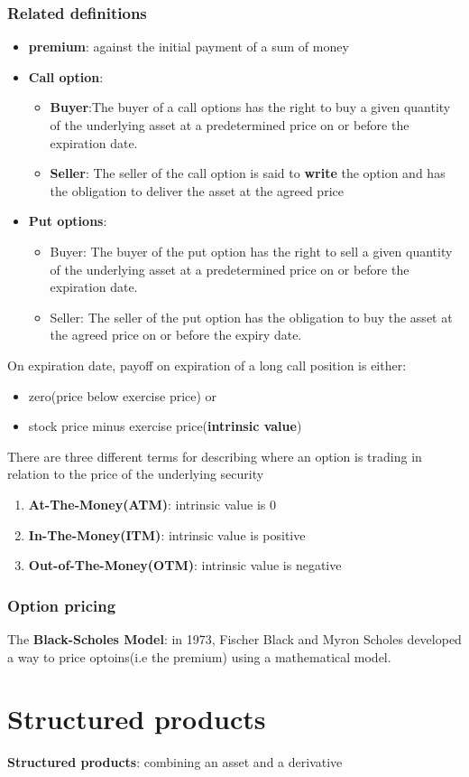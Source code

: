 \documentclass{article}
\theoremstyle{definition}
\theoremstyle{thrm}
\theoremstyle{lma}
\theoremstyle{ppst}
\theoremstyle{crlr}
\begin{document}
\subsubsection{Related definitions}
\begin{itemize}
	\item \textbf{premium}: against the initial payment of a sum of money
	\item \textbf{Call option}: 
	\begin{itemize}
		\item \textbf{Buyer}:The buyer of a call options has the right to buy a given quantity of the underlying asset at a predetermined price on or before the expiration date.
		\item \textbf{Seller}: The seller of the call option is said to \textbf{write} the option and has the obligation to deliver the asset at the agreed price
	\end{itemize}
	\item \textbf{Put options}:
	\begin{itemize}
		\item Buyer: The buyer of the put option has the right to sell a given quantity of the underlying asset at a predetermined price on or before the expiration date.
		\item Seller: The seller of the put option has the obligation to buy the asset at the agreed price on or before the expiry date.
	\end{itemize}
\end{itemize}
On expiration date, payoff on expiration of a long call position is either:
\begin{itemize}
	\item zero(price below exercise price) or
	\item stock price minus exercise price(\textbf{intrinsic value})
\end{itemize}
There are three different terms for describing where an option is trading in relation to the price of the underlying security
\begin{enumerate}
	\item \textbf{At-The-Money(ATM)}: intrinsic value is 0
	\item \textbf{In-The-Money(ITM)}: intrinsic value is positive
	\item \textbf{Out-of-The-Money(OTM)}: intrinsic value is negative
\end{enumerate}

\subsubsection{Option pricing}
The \textbf{Black-Scholes Model}: in 1973, Fischer Black and Myron Scholes developed a way to price optoins(i.e the premium) using a mathematical model. 

\section{Structured products}
\textbf{Structured products}: combining an asset and a derivative
\end{document}
